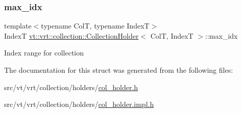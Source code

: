 \subsubsection{\texorpdfstring{max\+\_\+idx}{max\_idx}}
{\footnotesize\ttfamily template$<$typename ColT, typename IndexT$>$ \\
IndexT \hyperlink{structvt_1_1vrt_1_1collection_1_1_collection_holder}{vt\+::vrt\+::collection\+::\+Collection\+Holder}$<$ ColT, IndexT $>$\+::max\+\_\+idx}

Index range for collection 

The documentation for this struct was generated from the following files\+:\begin{DoxyCompactItemize}
\item 
src/vt/vrt/collection/holders/\hyperlink{col__holder_8h}{col\+\_\+holder.\+h}\item 
src/vt/vrt/collection/holders/\hyperlink{col__holder_8impl_8h}{col\+\_\+holder.\+impl.\+h}\end{DoxyCompactItemize}

